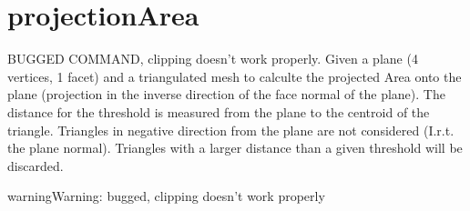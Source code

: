 \documentclass[letterpaper,10pt,english]{sphinxmanual}
\begin{document}
\section{projectionArea}
\label{\detokenize{pk_src.projectionArea:projectionarea}}\label{\detokenize{pk_src.projectionArea::doc}}\label{\detokenize{pk_src.projectionArea:id1}}
{\hyperref[\detokenize{index:commands}]{}}
\label{\detokenize{pk_src.projectionArea:module-pk_src.projectionArea}}
BUGGED COMMAND, clipping doesn’t work properly.
Given a plane (4 vertices, 1 facet) and a triangulated mesh to calculte the projected Area
onto the plane (projection in the inverse direction of the face normal of the plane).
The distance for the threshold is measured from the plane to the centroid of the triangle.
Triangles in negative direction from the plane are not considered (I.r.t. the plane normal).
Triangles with a larger distance than a given threshold will be discarded.

\begin{sphinxadmonition}{warning}{Warning:}
bugged, clipping doesn’t work properly
\end{sphinxadmonition}

 {\hyperref[\detokenize{pk_src.axisParallelPlane:axisparallelplane}]{}}
\end{document}
